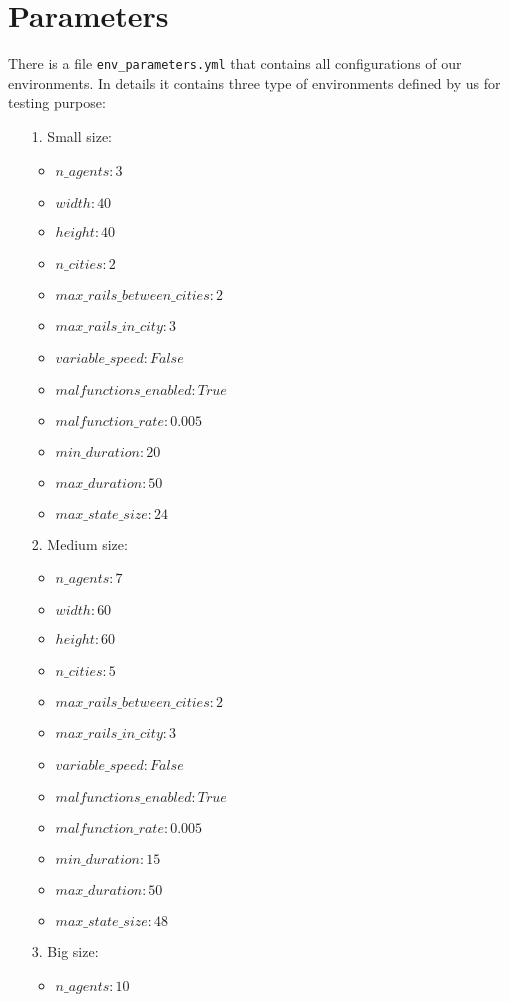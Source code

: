 \section{Parameters}
There is a file \texttt{env\_parameters.yml} that contains all configurations of our environments. In details it contains three type of environments defined by us for testing purpose:
\begin{enumerate}
	\item [1.] Small size:
	\begin{itemize}
		\item $n\_agents: 3$
		\item $width: 40$
		\item $height: 40$
		\item $n\_cities: 2$
		\item $max\_rails\_between\_cities: 2$
		\item $max\_rails\_in\_city: 3$
		\item  $variable\_speed: False$
		\item $malfunctions\_enabled: True$
		\item $malfunction\_rate: 0.005$
		\item $min\_duration: 20$
		\item $max\_duration: 50$
		\item $max\_state\_size: 24$
	\end{itemize}
	\item [2.] Medium size:
		\begin{itemize}
		\item $n\_agents: 7 $
		\item $width: 60 $
		\item $height: 60 $
		\item $n\_cities: 5 $
		\item $max\_rails\_between\_cities: 2 $
		\item $max\_rails\_in\_city: 3 $
		\item  $variable\_speed: False $
		\item $malfunctions\_enabled: True $
		\item $malfunction\_rate: 0.005 $
		\item $min\_duration: 15 $
		\item $max\_duration: 50 $
		\item $max\_state\_size: 48$
	\end{itemize}
	\item [3.] Big size:
		\begin{itemize}
		\item $n\_agents: 10 $

\end{itemize}
\end{enumerate}

